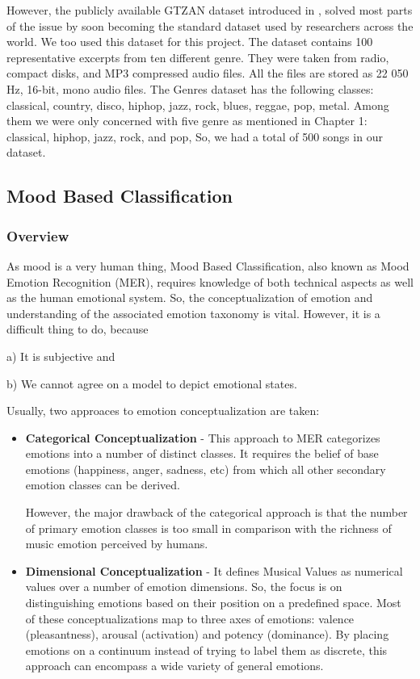 However, the publicly available GTZAN dataset introduced in \cite{Tzanetakis2002}, solved most parts of the issue by soon becoming the standard dataset used by researchers across the world.
We too used this dataset for this project.
The dataset contains 100 representative excerpts from ten different genre.
They were taken from radio, compact disks, and MP3 compressed audio files. All the files are stored as 22 050 Hz, 16-bit, mono audio files. 
The Genres dataset has the following classes: classical, country, disco, hiphop, jazz, rock, blues, reggae, pop, metal.
Among them we were only concerned with five genre as mentioned in Chapter 1: classical, hiphop, jazz, rock, and pop, So, we had a total of 500 songs in our dataset. 

\subsection{Mood Based Classification}

\subsubsection{Overview}

As mood is a very human thing, Mood Based Classification, also known as Mood Emotion Recognition (MER), requires knowledge of both technical aspects as well as the human emotional system.
So, the conceptualization of emotion and understanding of the associated emotion taxonomy is vital. However, it is a difficult thing to do, because 

a) It is subjective and 

b) We cannot agree on a model to depict emotional states.

Usually, two approaces to emotion conceptualization are taken: 

\begin{itemize}
    \item \textbf{Categorical Conceptualization} - This approach to MER categorizes emotions into a number of distinct classes. 
        It requires the belief of base emotions (happiness, anger, sadness, etc) from which all other secondary emotion classes can be derived.\cite{Ekman1992}

        However, the major drawback of the categorical approach is that the number of primary emotion classes is too small in comparison with the richness of music emotion perceived by humans.

    \item \textbf{Dimensional Conceptualization} - It defines Musical Values as numerical values over a number of emotion dimensions. 
        So, the focus is on distinguishing emotions based on their position on a predefined space.
        Most of these conceptualizations map to three axes of emotions: valence (pleasantness), arousal (activation) and potency (dominance).
        By placing emotions on a continuum instead of trying to label them as discrete, this approach can encompass a wide variety of general emotions.

\end{itemize}

